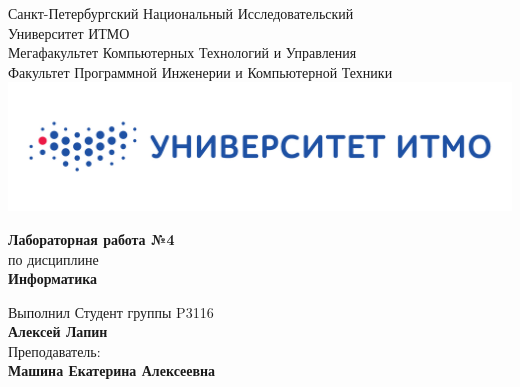 \documentclass[12pt,onecolumn]{article}
\begin{document}
\setcounter{tocdepth}{4}
\begin{center}
    Санкт-Петербургский Национальный Исследовательский\\ 
    Университет ИТМО\\
    Мегафакультет Компьютерных Технологий и Управления\\
    Факультет Программной Инженерии и Компьютерной Техники \\
    \includegraphics[scale=0.3]{itm.jpg} %
\end{center}
\vspace{1cm}


\begin{center}
    \textbf{Лабораторная работа №4}\\
    по дисциплине\\
    \textbf{Информатика}
\end{center}

\vspace{2cm}

\begin{flushright}
  Выполнил Студент  группы P3116\\
  \textbf{Алексей Лапин}\\
  Преподаватель: \\
  \textbf{Машина Екатерина Алексеевна }\\
\end{flushright}
\end{document}
